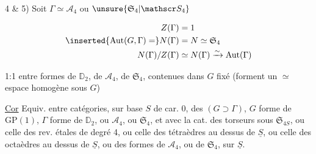
4 \& 5) Soit $\Gamma\simeq\mathcal A_4$ ou $\unsure{\mathfrak S_4|\mathscr S_4}$

\[
\begin{aligned}
Z(\Gamma)&=1\\ 
\inserted{\mathrm{Aut}(G,\Gamma)=}N(\Gamma)&=N\simeq\mathfrak S_4\\ 
N(\Gamma)/Z(\Gamma)&\simeq N(\Gamma)\xrightarrow{\sim}\mathrm{Aut}(\Gamma)
\end{aligned}
\]

\uline{} 1:1 entre  formes de $\mathbb D_2$, de $\mathcal A_4$,
de $\mathfrak S_4$, contenues dans $G$ fixé
(forment un $\simeq$ espace homogène sous $G$)

\uline{Cor} Equiv. entre catégories, sur base $S$ de
car. 0, des $(G\supset\Gamma)$, $G$ forme de $\mathrm{GP}(1)$, $\Gamma$
forme de $\mathbb D_2$, ou $\mathcal A_4$, ou $\mathfrak S_4$, et avec la
cat. des torseurs sous $\mathfrak S_{4S}$, ou celle
des rev. étales de degré 4, ou celle des
tétraèdres au dessus de $\underline S$, ou celle des
octaèdres au dessus de $\underline S$, ou des formes
de $\mathcal A_4$, ou de $\mathfrak S_4$, sur $\underline S$.

